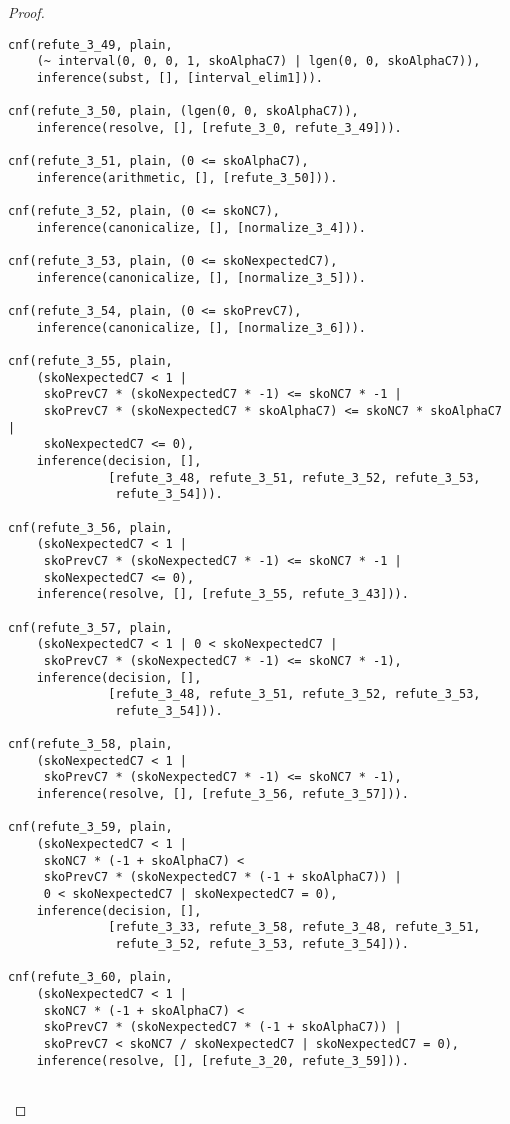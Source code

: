 \begin{proof}
\begin{verbatim}
cnf(refute_3_49, plain,
    (~ interval(0, 0, 0, 1, skoAlphaC7) | lgen(0, 0, skoAlphaC7)),
    inference(subst, [], [interval_elim1])).

cnf(refute_3_50, plain, (lgen(0, 0, skoAlphaC7)),
    inference(resolve, [], [refute_3_0, refute_3_49])).

cnf(refute_3_51, plain, (0 <= skoAlphaC7),
    inference(arithmetic, [], [refute_3_50])).

cnf(refute_3_52, plain, (0 <= skoNC7),
    inference(canonicalize, [], [normalize_3_4])).

cnf(refute_3_53, plain, (0 <= skoNexpectedC7),
    inference(canonicalize, [], [normalize_3_5])).

cnf(refute_3_54, plain, (0 <= skoPrevC7),
    inference(canonicalize, [], [normalize_3_6])).

cnf(refute_3_55, plain,
    (skoNexpectedC7 < 1 |
     skoPrevC7 * (skoNexpectedC7 * -1) <= skoNC7 * -1 |
     skoPrevC7 * (skoNexpectedC7 * skoAlphaC7) <= skoNC7 * skoAlphaC7 |
     skoNexpectedC7 <= 0),
    inference(decision, [],
              [refute_3_48, refute_3_51, refute_3_52, refute_3_53,
               refute_3_54])).

cnf(refute_3_56, plain,
    (skoNexpectedC7 < 1 |
     skoPrevC7 * (skoNexpectedC7 * -1) <= skoNC7 * -1 |
     skoNexpectedC7 <= 0),
    inference(resolve, [], [refute_3_55, refute_3_43])).

cnf(refute_3_57, plain,
    (skoNexpectedC7 < 1 | 0 < skoNexpectedC7 |
     skoPrevC7 * (skoNexpectedC7 * -1) <= skoNC7 * -1),
    inference(decision, [],
              [refute_3_48, refute_3_51, refute_3_52, refute_3_53,
               refute_3_54])).

cnf(refute_3_58, plain,
    (skoNexpectedC7 < 1 |
     skoPrevC7 * (skoNexpectedC7 * -1) <= skoNC7 * -1),
    inference(resolve, [], [refute_3_56, refute_3_57])).

cnf(refute_3_59, plain,
    (skoNexpectedC7 < 1 |
     skoNC7 * (-1 + skoAlphaC7) <
     skoPrevC7 * (skoNexpectedC7 * (-1 + skoAlphaC7)) |
     0 < skoNexpectedC7 | skoNexpectedC7 = 0),
    inference(decision, [],
              [refute_3_33, refute_3_58, refute_3_48, refute_3_51,
               refute_3_52, refute_3_53, refute_3_54])).

cnf(refute_3_60, plain,
    (skoNexpectedC7 < 1 |
     skoNC7 * (-1 + skoAlphaC7) <
     skoPrevC7 * (skoNexpectedC7 * (-1 + skoAlphaC7)) |
     skoPrevC7 < skoNC7 / skoNexpectedC7 | skoNexpectedC7 = 0),
    inference(resolve, [], [refute_3_20, refute_3_59])).


\end{verbatim}
\end{proof}
